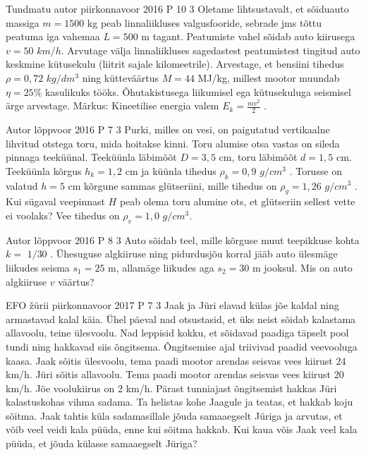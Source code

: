 \documentclass[11pt]{article}
\begin{document}
{%
{Tundmatu autor} %
{piirkonnavoor} %
{2016} %
{P 10} %
{3} %
{
\ifStatement
Oletame lihtsustavalt, et sõiduauto massiga $m = 1500$ kg peab linnaliikluses valgusfooride, sebrade jms tõttu peatuma iga vahemaa $L = 500$ m tagant. Peatumiste vahel sõidab auto kiirusega $v = 50$ $km/h$. Arvutage välja linnaliikluses sagedastest peatumistest tingitud auto keskmine kütusekulu (liitrit sajale kilomeetrile). Arvestage, et bensiini tihedus $\rho = 0,72$ $kg/dm^3$ ning kütteväärtus $M = 44$ MJ/kg, millest mootor muundab $\eta = 25$\% kasulikuks tööks. Õhutakistusega liikumisel ega kütusekuluga seismisel ärge arvestage. Märkus: Kineetilise energia valem $E_k = \frac{mv^2}{2}$ .\fi
}

{Autor} %
{lõppvoor} %
{2016} %
{P 7} %
{3} %
{
\ifStatement
Purki, milles on vesi, on paigutatud vertikaalne lihvitud otstega toru, mida hoitakse kinni. Toru alumise otsa vastas on sileda pinnaga teeküünal. Teeküünla läbimõõt $D = 3,5$ cm, toru läbimõõt $d = 1,5$ cm. Teeküünla kõrgus $h_k = 1,2$ cm ja küünla tihedus $\rho_k = 0,9$ $g/cm^3$ . Torusse on valatud $h = 5$ cm kõrgune sammas glütseriini, mille tihedus on $\rho_g = 1,26$ $g/cm^3$ . Kui sügaval veepinnast $H$ peab olema toru alumine ots, et glütseriin sellest vette ei voolaks? Vee tihedus on $\rho_v = 1,0$ $g/cm^3$.
\fi
}

{Autor} %
{lõppvoor} %
{2016} %
{P 8} %
{3} %
{
\ifStatement
Auto sõidab teel, mille kõrguse muut teepikkuse kohta $k = $ $1/30$ . Ühesuguse algkiiruse ning pidurdusjõu korral jääb auto ülesmäge liikudes seisma $s_1 = 25$ m, allamäge liikudes aga $s_2 = 30$ m jooksul. Mis on auto algkiiruse $v$ väärtus?
\fi
}

{EFO žürii} %
{piirkonnavoor} %
{2017} %
{P 7} %
{3} %
{
\ifStatement
Jaak ja Jüri elavad külas jõe kaldal ning armastavad kalal käia. Ühel päeval nad otsustasid, et üks neist sõidab kalastama allavoolu, teine ülesvoolu. Nad leppisid kokku, et sõidavad paadiga täpselt pool tundi ning hakkavad siis õngitsema. Õngitsemise ajal triivivad paadid veevooluga kaasa. Jaak sõitis ülesvoolu, tema paadi mootor arendas seisvas vees kiirust $24$ km/h. Jüri sõitis allavoolu. Tema paadi mootor arendas seisvas vees kiirust $20$ km/h. Jõe voolukiirus on $2$ km/h. Pärast tunniajast õngitsemist hakkas Jüri kalastuskohas vihma sadama. Ta helistas kohe Jaagule ja teatas, et hakkab koju sõitma. Jaak tahtis küla sadamasillale jõuda samaaegselt Jüriga ja arvutas, et võib veel veidi kala püüda, enne kui sõitma hakkab. Kui kaua võis Jaak veel kala püüda, et jõuda külasse samaaegselt Jüriga?
\fi
}

}
\end{document}
